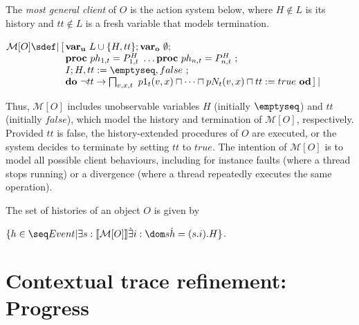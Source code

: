 \documentclass[11pt]{llncs}
\def \proc{{\bf proc}\ }
\def \lact{\mathop{|\joinrel\![}}
\def \ract{\mathop{]\joinrel\!|}}
\def \asgn  {{\;:=\;}}
\def \lvar {{\bf var_u}\ }
\def \gvar {{\bf var_o}\ }
\newcommand{\ddo}{\mathbf{do}}
\newcommand{\ood}{\mathbf{od}}
\newcommand{\MGC}{\mathcal{M}}
\begin{document}
\begin{definition}
  \label{def:mgc}
  The \emph{most general client} of $O$ is the action system below,
  where $H \notin L$ is its history and $tt \notin L$ is a fresh
  variable that models termination.  \smallskip

  \hfill$ \MGC[O] \sdef 
  \begin{array}[t]{@{}l@{}}
    \lact 
    \begin{array}[t]{@{}ll@{}} \lvar L \cup \{H, tt\} ; \gvar
      \emptyset ; \\
\proc ph_{1,t} = P_{1,t}^H\  \dots \proc ph_{n,t} =
      P_{n,t}^H\ ;
      \\
      I ; H, tt \asgn \emptyseq, false\ ; \\
      \ddo\ \neg tt
      \to \textstyle\bigsqcap_{v, x, t}\ p1_t(v, x) \sqcap \dots \sqcap pN_t(v, x)
      \sqcap tt \asgn true\ \ood \ract
    \end{array}
  \end{array}
  $\hfill{\ }
\end{definition}

\noindent Thus, $\MGC[O]$ includes unobservable variables $H$
(initially $\emptyseq$) and $tt$ (initially $false$), which model the
history and termination of $\MGC[O]$, respectively. Provided $tt$ is
false, the history-extended procedures of $O$ are executed, or the
system decides to terminate by setting $tt$ to $true$. The intention
of $\MGC[O]$ is to model all possible client behaviours, including for
instance faults (where a thread stops running) or a divergence (where
a thread repeatedly executes the same operation).

\begin{definition}
  The set of histories of an object $O$ is given by\smallskip

\noindent\hfill  $\{h \in \seq Event | \exists s : \llbracket \MGC[O] \rrbracket \dot
  \exists i : \dom s \dot h = (s.i).H\}$. \hfill{\ }
\end{definition}






  \vspace{-4mm}







\section{Contextual trace refinement: Progress}
\label{sec:corr-cond}
\end{document}
